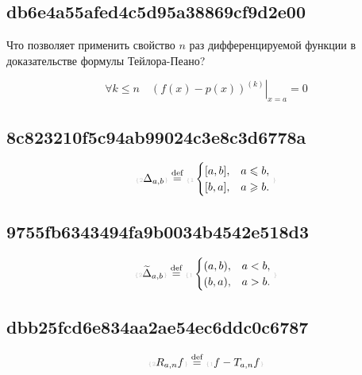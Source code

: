 \documentclass[11pt, a5paper]{article}
\newenvironment{note}[1]{\goodbreak\par\subsection{\hfill \color{lightgray}\tiny #1}}{}
\newenvironment{cloze}[2][\ldots]{\begin{leftbar}}{\end{leftbar}}
\newenvironment{icloze}[2][\ldots]{%
  \ignorespaces\text{\tiny \color{lightgray}\{#2} %
}{%
  \text{\tiny\color{lightgray}\}}\unskip%
}
\begin{document}
\begin{note}{db6e4a55afed4c5d95a38869cf9d2e00}
    Что позволяет применить свойство \( n \) раз дифференцируемой функции в доказательстве формулы Тейлора-Пеано?

    \begin{cloze}{1}
        \[
            \forall k \left. \leqslant n \quad \left(f(x) - p(x)\right)^{(k)} \right|_{x = a} = 0
        \]
    \end{cloze}
\end{note}

\begin{note}{8c823210f5c94ab99024c3e8c3d6778a}
    \[
        \begin{icloze}{2}\Delta _{a, b}\end{icloze}
        \overset{\text{def}}=
        \begin{icloze}{1}\begin{cases}
            [a, b], & a \leqslant b, \\
            [b, a], & a \geqslant b.
        \end{cases}\end{icloze}
    \]
\end{note}

\begin{note}{9755fb6343494fa9b0034b4542e518d3}
    \[
        \begin{icloze}{2}\widetilde \Delta _{a, b}\end{icloze}
        \overset{\text{def}}=
        \begin{icloze}{1}\begin{cases}
            (a, b), & a < b, \\
            (b, a), & a > b.
        \end{cases}\end{icloze}
    \]
\end{note}

\begin{note}{dbb25fcd6e834aa2ae54ec6ddc0c6787}
    \[
        \begin{icloze}{2}R_{a, n} f \end{icloze}
        \overset{\text{def}}=
        \begin{icloze}{1}f - T_{a, n} f\end{icloze}
    \]
\end{note}
\end{document}
